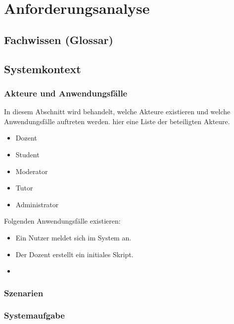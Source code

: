 \documentclass[12pt,a4paper]{article}
\begin{document}
\section{Anforderungsanalyse}
\subsection{Fachwissen (Glossar)}

\subsection{Systemkontext}
\subsubsection{Akteure und Anwendungsfälle}
In diesem Abschnitt wird behandelt, welche Akteure existieren und welche Anwendungsfälle auftreten werden. 
hier eine Liste der beteiligten Akteure.

\begin{itemize}
\item Dozent
\item Student
\item Moderator
\item Tutor
\item Administrator
\end{itemize}

Folgenden Anwendungsfälle existieren:
\begin{itemize}
\item Ein Nutzer meldet sich im System an.
\item Der Dozent erstellt ein initiales Skript.
\item 
\end{itemize}
\subsubsection{Szenarien}
\subsubsection{Systemaufgabe}
\end{document}
